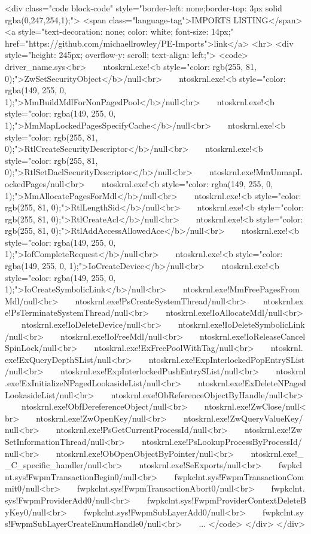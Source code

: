 \begin{rawhtml}
<div class="code block-code" style="border-left: none;border-top: 3px solid rgba(0,247,254,1);">
            <span class="language-tag">IMPORTS LISTING</span>
            <a style="text-decoration: none; color: white; font-size: 14px;" href="https://github.com/michaellrowley/PE-Imports">link</a>
            <hr>
            <div style="height: 245px; overflow-y: scroll; text-align: left;">
                <code>
                    driver_name.sys<br>    ntoskrnl.exe!<b style="color: rgb(255, 81, 0);">ZwSetSecurityObject</b>/null<br>    ntoskrnl.exe!<b style="color: rgba(149, 255, 0, 1);">MmBuildMdlForNonPagedPool</b>/null<br>    ntoskrnl.exe!<b style="color: rgba(149, 255, 0, 1);">MmMapLockedPagesSpecifyCache</b>/null<br>    ntoskrnl.exe!<b style="color: rgb(255, 81, 0);">RtlCreateSecurityDescriptor</b>/null<br>    ntoskrnl.exe!<b style="color: rgb(255, 81, 0);">RtlSetDaclSecurityDescriptor</b>/null<br>    ntoskrnl.exe!MmUnmapLockedPages/null<br>    ntoskrnl.exe!<b style="color: rgba(149, 255, 0, 1);">MmAllocatePagesForMdl</b>/null<br>    ntoskrnl.exe!<b style="color: rgb(255, 81, 0);">RtlLengthSid</b>/null<br>    ntoskrnl.exe!<b style="color: rgb(255, 81, 0);">RtlCreateAcl</b>/null<br>    ntoskrnl.exe!<b style="color: rgb(255, 81, 0);">RtlAddAccessAllowedAce</b>/null<br>    ntoskrnl.exe!<b style="color: rgba(149, 255, 0, 1);">IofCompleteRequest</b>/null<br>    ntoskrnl.exe!<b style="color: rgba(149, 255, 0, 1);">IoCreateDevice</b>/null<br>    ntoskrnl.exe!<b style="color: rgba(149, 255, 0, 1);">IoCreateSymbolicLink</b>/null<br>    ntoskrnl.exe!MmFreePagesFromMdl/null<br>    ntoskrnl.exe!PsCreateSystemThread/null<br>    ntoskrnl.exe!PsTerminateSystemThread/null<br>    ntoskrnl.exe!IoAllocateMdl/null<br>    ntoskrnl.exe!IoDeleteDevice/null<br>    ntoskrnl.exe!IoDeleteSymbolicLink/null<br>    ntoskrnl.exe!IoFreeMdl/null<br>    ntoskrnl.exe!IoReleaseCancelSpinLock/null<br>    ntoskrnl.exe!ExFreePoolWithTag/null<br>    ntoskrnl.exe!ExQueryDepthSList/null<br>    ntoskrnl.exe!ExpInterlockedPopEntrySList/null<br>    ntoskrnl.exe!ExpInterlockedPushEntrySList/null<br>    ntoskrnl.exe!ExInitializeNPagedLookasideList/null<br>    ntoskrnl.exe!ExDeleteNPagedLookasideList/null<br>    ntoskrnl.exe!ObReferenceObjectByHandle/null<br>    ntoskrnl.exe!ObfDereferenceObject/null<br>    ntoskrnl.exe!ZwClose/null<br>    ntoskrnl.exe!ZwOpenKey/null<br>    ntoskrnl.exe!ZwQueryValueKey/null<br>    ntoskrnl.exe!PsGetCurrentProcessId/null<br>    ntoskrnl.exe!ZwSetInformationThread/null<br>    ntoskrnl.exe!PsLookupProcessByProcessId/null<br>    ntoskrnl.exe!ObOpenObjectByPointer/null<br>    ntoskrnl.exe!__C_specific_handler/null<br>    ntoskrnl.exe!SeExports/null<br>    fwpkclnt.sys!FwpmTransactionBegin0/null<br>    fwpkclnt.sys!FwpmTransactionCommit0/null<br>    fwpkclnt.sys!FwpmTransactionAbort0/null<br>    fwpkclnt.sys!FwpmProviderAdd0/null<br>    fwpkclnt.sys!FwpmProviderContextDeleteByKey0/null<br>    fwpkclnt.sys!FwpmSubLayerAdd0/null<br>    fwpkclnt.sys!FwpmSubLayerCreateEnumHandle0/null<br>    ...
                </code>
            </div>
        </div>
\end{rawhtml}

